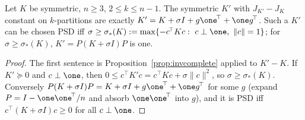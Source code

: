 \begin{corollary}\label{cor:reps}
Let $K$ be symmetric, $n\ge3$, $2\le k\le n-1$. The symmetric $K'$ with $J_{K'}-J_K$ constant on $k$-partitions are exactly $K'=K+\sigma I+g\one^{\!\top}+\one g^{\!\top}$. Such a $K'$ can be chosen PSD iff $\sigma\ge\sigma_*(K):=\max\{-c^{\!\top}Kc:\ c\perp\one,\ \lVert c\rVert=1\}$; for $\sigma\ge\sigma_*(K)$, $K'=P(K+\sigma I)P$ is one. 
\end{corollary}
\begin{proof}
The first sentence is Proposition~\ref{prop:invcomplete} applied to $K'-K$. If $K'\succeq0$ and $c\perp\one$, then $0\le c^{\!\top}K'c=c^{\!\top}Kc+\sigma\lVert c\rVert^2$, so $\sigma\ge\sigma_*(K)$. Conversely $P(K+\sigma I)P=K+\sigma I+g\one^{\!\top}+\one g^{\!\top}$ for some $g$ (expand $P=I-\one\one^{\!\top}/n$ and absorb $\one\one^{\!\top}$ into $g$), and it is PSD iff $c^{\!\top}(K+\sigma I)c\ge0$ for all $c\perp\one$.
\end{proof}


